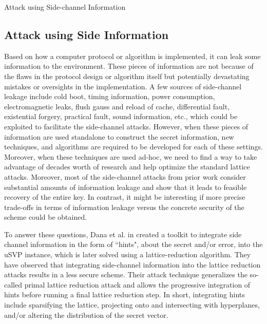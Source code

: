 Attack using Side-channel Information




\subsection{Attack using Side Information}
Based on how a computer protocol or algorithm is implemented, it can leak some information to the environment. These pieces of information are not because of the flaws in the protocol design or algorithm itself but potentially devastating mistakes or oversights in the implementation. A few sources of side-channel leakage include cold boot, timing information, power consumption, electromagnetic leaks, flush gauss and reload of cache, differential fault, existential forgery, practical fault, sound information, etc., which could be exploited to facilitate the side-channel attacks. However, when these pieces of information are used standalone to construct the secret information, new techniques, and algorithms are required to be developed for each of these settings. Moreover, when these techniques are used ad-hoc, we need to find a way to take advantage of decades worth of research and help optimize the standard lattice attacks. Moreover, most of the side-channel attacks from prior work consider substantial amounts of information leakage and show that it leads to feasible recovery of the entire key. In contrast, it might be interesting if more precise trade-offs in terms of information leakage versus the concrete security of the scheme could be obtained.

To answer these questions, Dana et al. in \cite{dachman2020lwe} created a toolkit to integrate side channel information in the form of ``hints", about the secret and/or error, into the uSVP instance, which is later solved using a lattice-reduction algorithm. They have observed that integrating side-channel information into the lattice reduction attacks results in a less secure scheme. Their attack technique generalizes the so-called primal lattice reduction attack and allows the progressive integration of hints before running a final lattice reduction step. In short, integrating hints include sparsifying the lattice, projecting onto and intersecting with hyperplanes, and/or altering the distribution of the secret vector.

